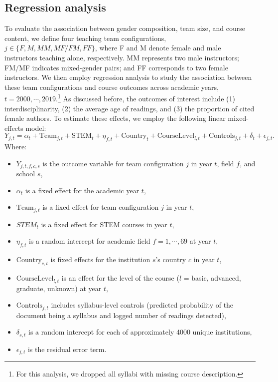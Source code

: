 \documentclass[
  british,
  11pt,
]{article}
\begin{document}
\subsection{Regression analysis}\label{regression-analysis}

To evaluate the association between gender composition, team size, and course content, we define four teaching team configurations, \(j\in \{F, M, MM, MF/FM, FF\}\), where F and M denote female and male instructors teaching alone, respectively. MM represents two male instructors; FM/MF indicates mixed-gender pairs; and FF corresponds to two female instructors. We then employ regression analysis to study the association between these team configurations and course outcomes across academic years, \(t = 2000, \cdots, 2019\).\footnote{For this analysis, we dropped all syllabi with missing course description.} As discussed before, the outcomes of interest include (1) interdisciplinarity, (2) the average age of readings, and (3) the proportion of cited female authors. To estimate these effects, we employ the following linear mixed-effects model:
\[
Y_{j, t} = 
 \alpha_t + 
 \text{Team}_{j, t} + 
 \text{STEM}_t + \eta_{f,t} +  %
 \text{Country}_{t} + 
 \text{CourseLevel}_{l,t} + 
 \text{Controls}_{j,t} + 
 \delta_{t} + 
 \epsilon_{j, t}.
\]
Where:

\begin{itemize}
\item
  \(Y_{j, t, f, c, s}\) is the outcome variable for team configuration \(j\) in year \(t\), field \(f\), and school \(s\),
\item
  \(\alpha_{t}\) is a fixed effect for the academic year \(t\),
\item
  \(\text{Team}_{j, t}\) is a fixed effect for team configuration \(j\) in year \(t\),
\item
  \(STEM_{t}\) is a fixed effect for STEM courses in year \(t\),
\item
  \(\eta_{f,t}\) is a random intercept for academic field \(f = 1,\cdots, 69\) at year \(t\),
\item
  \(\text{Country}_{c, t}\) is fixed effects for the institution \(s\)'s country \(c\) in year \(t\),
\item
  \(\text{CourseLevel}_{l, t}\) is an effect for the level of the course (\(l\) = basic, advanced, graduate, unknown) at year \(t\),
\item
  \(\text{Controls}_{j,t}\) includes syllabus-level controls (predicted probability of the document being a syllabus and logged number of readings detected),
\item
  \(\delta_{s, t}\) is a random intercept for each of approximately 4000 unique institutions,
\item
  \(\epsilon_{j,t}\) is the residual error term.
\end{itemize}
\end{document}
